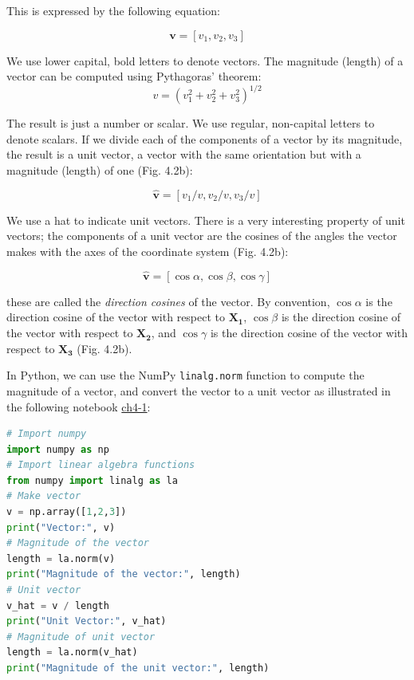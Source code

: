 \documentclass[a4paper , 12pt]{book}
\newcommand{\code}[1]{\colorbox{light-gray}{\texttt{#1}}}
\begin{document}
This is expressed by the following equation:

\begin{equation}
    \mathbf{v} = [v_1,v_2,v_3]
\end{equation}

We use lower capital, bold letters to denote vectors. The magnitude (length) of a vector can be computed using Pythagoras' theorem:
\begin{equation}
    v = (v_1^2+v_2^2+v_3^2)^{1/2}
\end{equation}

The result is just a number or scalar. We use regular, non-capital letters to denote scalars. If we divide each of the components of a vector by its magnitude, the result is a unit vector, a vector with the same orientation but with a magnitude (length) of one (Fig. 4.2b):

\begin{equation}
    \mathbf{\hat{v}}=[v_1/v,v_2/v,v_3/v]
\end{equation}

We use a hat to indicate unit vectors. There is a very interesting property of unit vectors; the components of a unit vector are the cosines of the angles the vector makes with the axes of the coordinate system (Fig. 4.2b):

\begin{equation}
    \mathbf{\hat v} = [\cos\alpha,\cos\beta,\cos\gamma]
\end{equation}

these are called the \textit{direction cosines} of the vector. By convention, $\cos\alpha$ is the direction cosine of the vector with respect to $\mathbf{X_1}$, $\cos\beta$ is the direction cosine of the vector with respect to $\mathbf{X_2}$, and $\cos\gamma$ is the direction cosine of the vector with respect to $\mathbf{X_3}$ (Fig. 4.2b).

In Python, we can use the NumPy \code{linalg.norm} function to compute the magnitude of a vector, and convert the vector to a unit vector as illustrated in the following notebook \href{https://github.com/nfcd/compGeo/blob/master/source/notebooks/ch4-1.ipynb}{ch4-1}:

\begin{center}
\begin{lstlisting}[language=Python, frame=single]
# Import numpy
import numpy as np
# Import linear algebra functions
from numpy import linalg as la
# Make vector
v = np.array([1,2,3])
print("Vector:", v)
# Magnitude of the vector
length = la.norm(v) 
print("Magnitude of the vector:", length)
# Unit vector
v_hat = v / length
print("Unit Vector:", v_hat)
# Magnitude of unit vector
length = la.norm(v_hat) 
print("Magnitude of the unit vector:", length)
\end{lstlisting}
\end{center}
\end{document}
